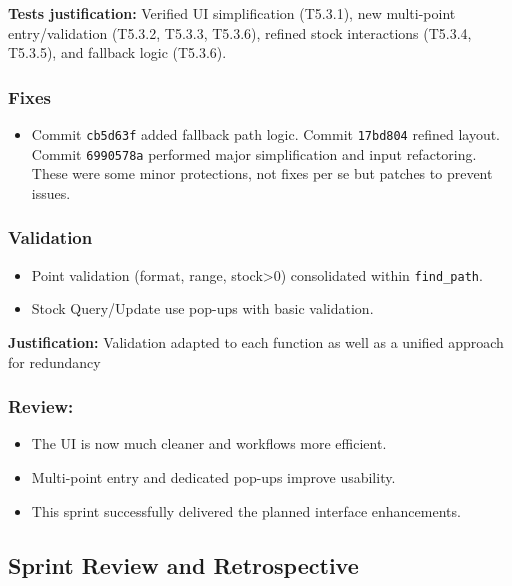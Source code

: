 \textbf{Tests justification:} Verified UI simplification (T5.3.1), new multi-point entry/validation (T5.3.2, T5.3.3, T5.3.6), refined stock interactions (T5.3.4, T5.3.5), and fallback logic (T5.3.6).

\subsubsection{Fixes}
\begin{itemize}
	\item Commit \verb|cb5d63f| added fallback path logic. Commit \verb|17bd804| refined layout. Commit \verb|6990578a| performed major simplification and input refactoring. These were some minor protections, not fixes per se but patches to prevent issues.
\end{itemize}

\subsubsection{Validation}
\begin{itemize}
	\item Point validation (format, range, stock>0) consolidated within \verb|find_path|.
	\item Stock Query/Update use pop-ups with basic validation.
\end{itemize}
\textbf{Justification:} Validation adapted to each function as well as a unified approach for redundancy

\subsubsection{Review:}
\begin{itemize}
	\item The UI is now much cleaner and workflows more efficient.
	\item Multi-point entry and dedicated pop-ups improve usability.
	\item This sprint successfully delivered the planned interface enhancements.
\end{itemize}

\clearpage
\subsection{Sprint Review and Retrospective}

